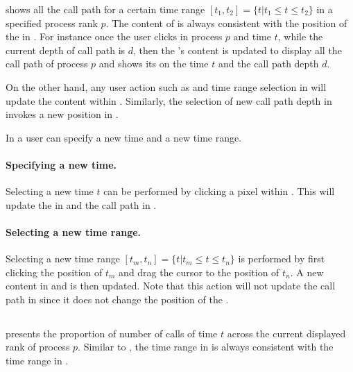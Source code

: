 \depthview{} shows all the call path for a certain time range $[t_1,t_2]= \{t | t_1\leq t\leq t_2\}$ in a specified process rank $p$. The content of \depthview{} is always consistent with the position of the \crosshair{} in \traceview{}.
For instance once the user clicks in process $p$ and time $t$, while the current depth of call path is $d$, then the \depthview's content is updated to display all the call path of process $p$ and shows its \crosshair{} on the time $t$ and the call path depth $d$.

On the other hand, any user action such as \crosshair{} and time range selection in \depthview{} will update the content within \traceview. Similarly, the selection of new call path depth in \callview{} invokes a new position in \depthview.

In \depthview{} a user can specify a new \crosshair{} time and a new time range.
\paragraph{Specifying a new \crosshair{} time.} Selecting a new \crosshair{} time $t$ can be performed by clicking a pixel within \depthview{}. This will update the \crosshair{} in \traceview{} and the call path in \callview.

\paragraph{Selecting a new time range.} Selecting a new time range $[t_m,t_n]= \{t | t_m\leq t\leq t_n\}$ is performed by first clicking the position of $t_m$ and drag the cursor to the position of $t_n$. A new content in \depthview{} and \traceview{} is then updated. Note that this action will not update the call path in \callview{} since it does not change the position of the \crosshair.


\subsection{\summaryview}
\label{sec:summaryview}

\summaryview{} presents the proportion of number of calls of time $t$ across the current displayed rank of process $p$.
Similar to \depthview, the time range in \summaryview{} is always consistent with the time range in \traceview{}.


